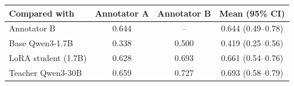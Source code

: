 \begin{tabular}{lccc}
\toprule
Compared with & Annotator A & Annotator B & Mean (95\% CI) \\
\midrule
Annotator B & 0.644 & -- & 0.644 (0.49--0.78) \\
Base Qwen3-1.7B & 0.338 & 0.500 & 0.419 (0.25--0.56) \\
LoRA student (1.7B) & 0.628 & 0.693 & 0.661 (0.54--0.76) \\
Teacher Qwen3-30B & 0.659 & 0.727 & 0.693 (0.58--0.79) \\
\bottomrule
\end{tabular}
